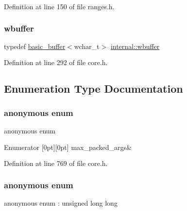 Definition at line 150 of file ranges.\+h.

\mbox{\label{namespaceinternal_a6d6bf139e2a200cfb80dfcb8a0da048e}} 
\subsubsection{\texorpdfstring{wbuffer}{wbuffer}}
{\footnotesize\ttfamily typedef \hyperlink{classinternal_1_1basic__buffer}{basic\+\_\+buffer}$<$wchar\+\_\+t$>$ \hyperlink{namespaceinternal_a6d6bf139e2a200cfb80dfcb8a0da048e}{internal\+::wbuffer}}



Definition at line 292 of file core.\+h.



\subsection{Enumeration Type Documentation}
\mbox{\label{namespaceinternal_a7f3ac89c89503ec2e08800b69e0e6934}} 
\subsubsection{\texorpdfstring{anonymous enum}{anonymous enum}}
{\footnotesize\ttfamily anonymous enum}

\begin{DoxyEnumFields}{Enumerator}
[0pt][0pt]{}\mbox{\label{namespaceinternal_a7f3ac89c89503ec2e08800b69e0e6934a1868fd9ce8f55804389e2ef50fa5901c}} 
max\+\_\+packed\+\_\+args&\\
\hline

\end{DoxyEnumFields}


Definition at line 769 of file core.\+h.

\mbox{\label{namespaceinternal_aa0ebf6bf81922f0239a461c5b2fd9bc7}} 
\subsubsection{\texorpdfstring{anonymous enum}{anonymous enum}}
{\footnotesize\ttfamily anonymous enum \+: unsigned long long}

